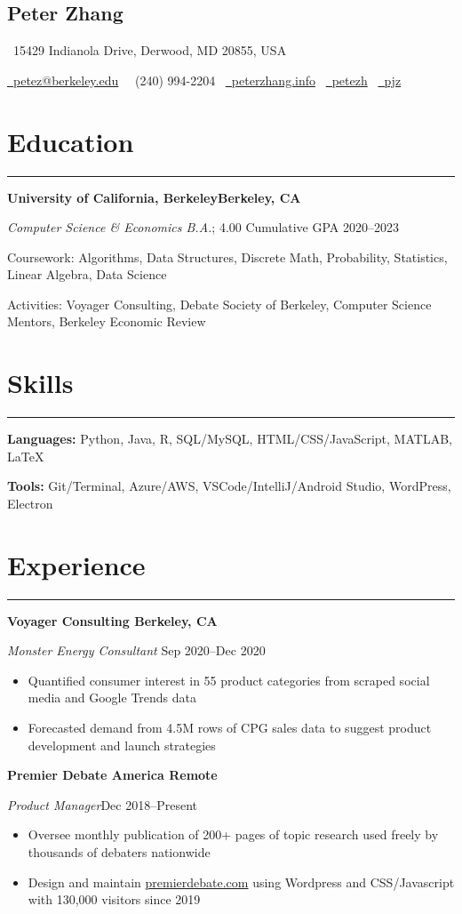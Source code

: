 \documentclass[11pt]{article}
\newcommand{\name}[1]{\begin{center}\section*{\huge \color{highlight} #1}\vspace{-0.5cm}\end{center}}
\newcommand{\topinfo}[1]{\begin{center}\vspace{-0.2cm}#1\vspace{-0.2cm}\end{center}}
\newcommand{\resumesection}[1]{\vspace{-0.6cm}\section*{\color{highlight}#1}\vspace{-0.3cm}\hrule\vspace{0.2cm}}
\begin{document}
\name{Peter Zhang}
\topinfo{\faHome \ 15429 Indianola Drive, Derwood, MD 20855, USA}
\topinfo{\href{mailto:petez@berkeley.edu}{\faEnvelope \ petez@berkeley.edu} \ \faPhone \ (240) 994-2204 \ \href{https://peterzhang.info/}{\faBriefcase \ peterzhang.info} \  \href{https://github.com/petezh}{\faGithub \ petezh} \  \href{https://www.linkedin.com/in/pjz/}{\faLinkedinSquare \ pjz}}

\resumesection{Education}

\textbf{University of California, Berkeley\hfill Berkeley, CA} \par
\textit{Computer Science \& Economics B.A.}; 4.00 Cumulative GPA \hfill 2020--2023\par
Coursework: Algorithms, Data Structures, Discrete Math, Probability, Statistics, Linear Algebra, Data Science\par
Activities: Voyager Consulting, Debate Society of Berkeley, Computer Science Mentors, Berkeley Economic Review

\resumesection{Skills}

\textbf{Languages:} Python, Java, R, SQL/MySQL, HTML/CSS/JavaScript, MATLAB, \LaTeX \par
\textbf{Tools:} Git/Terminal, Azure/AWS, VSCode/IntelliJ/Android Studio, WordPress, Electron

\resumesection{Experience}

\textbf{Voyager Consulting \hfill Berkeley, CA}\par

\textit{Monster Energy Consultant} \hfill Sep 2020--Dec 2020
\begin{itemize}
	\item Quantified consumer interest in 55 product categories from scraped social media and Google Trends data
	\item Forecasted demand from 4.5M rows of CPG sales data to suggest product development and launch strategies
\end{itemize}\par

\textbf{Premier Debate America \hfill Remote} \par

\textit{Product Manager}\hfill Dec 2018--Present
\begin{itemize}
	\item Oversee monthly publication of 200+ pages of topic research used freely by thousands of debaters nationwide
	\item Design and maintain \href{https://www.premierdebate.com/briefs/}{premierdebate.com} using Wordpress and CSS/Javascript with 130,000 visitors since 2019
\end{itemize}\vspace{0.1cm}
\end{document}
